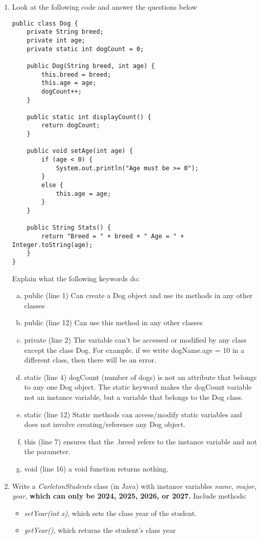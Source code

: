 \documentclass[letter]{article}
\begin{document}
\begin{enumerate}[1.]
    \item Look at the following code and answer the questions below

    \lstset{language=Java, 
        basicstyle=\ttfamily\small, 
        showstringspaces=false,
	numbers=left,
	frame=single,
	tabsize=4,
	commentstyle=,
}
    \begin{lstlisting}
public class Dog {
    private String breed;
    private int age;
    private static int dogCount = 0;

    public Dog(String breed, int age) {
        this.breed = breed;
        this.age = age;
        dogCount++;
    }

    public static int displayCount() {
        return dogCount;
    }

    public void setAge(int age) {
        if (age < 0) {
            System.out.println("Age must be >= 0");
        }
        else {
            this.age = age;
        }
    }

    public String Stats() {
        return "Breed = " + breed + " Age = " + Integer.toString(age);
    }       
}
    \end{lstlisting} Explain what the following keywords do:
    \begin{enumerate}[a)]
    	\item public (line 1) Can create a Dog object and use its methods in any other classes
            \item public (line 12) Can use this method in any other classes
    	\item private (line 2) The variable can't be accessed or modified by any class except the class Dog. For example, if we write dogName.age = 10 in a different class, then there will be an error.
    	\item static (line 4) dogCount (number of dogs) is not an attribute that belongs to any one Dog object. The static keyword makes the dogCount variable not an instance variable, but a variable that belongs to the Dog class. 
            \item static (line 12) Static methods can access/modify static variables and does not involve creating/reference any Dog object.
            \item this (line 7) ensures that the .breed refers to the instance variable and not the parameter.
            \item void (line 16) a void function returns nothing.
    \end{enumerate}

    \item Write a \textit{CarletonStudents} class (in Java) with instance variables \textit{name}, \textit{major}, \textit{year}, \textbf{which can only be 2024, 2025, 2026, or 2027.} Include methods:
    \begin{itemize}
        \item \textit{setYear(int x)}, which sets the class year of the student. 
        \item \textit{getYear()}, which returns the student's class year
    \end{itemize}
    

\end{enumerate}
\end{document}
